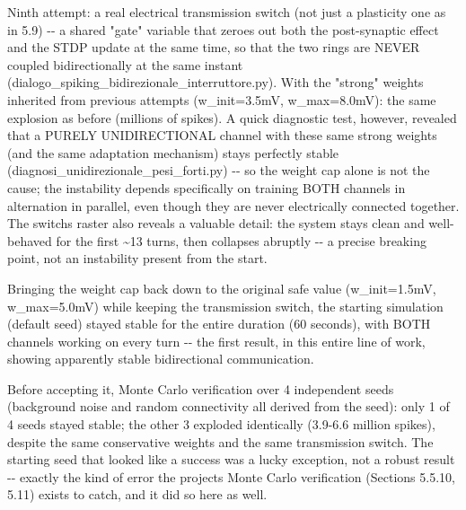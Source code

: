 \documentclass[
  english,
]{article}
\begin{document}
Ninth attempt: a real electrical transmission switch (not just a plasticity one as in 5.9) -\/- a shared "gate" variable that zeroes out both the post-synaptic effect and the STDP update at the same time, so that the two rings are NEVER coupled bidirectionally at the same instant (dialogo\_\allowbreak{}spiking\_\allowbreak{}bidirezionale\_\allowbreak{}interruttore.py). With the "strong" weights inherited from previous attempts (w\_\allowbreak{}init=3.5mV, w\_\allowbreak{}max=8.0mV): the same explosion as before (millions of spikes). A quick diagnostic test, however, revealed that a PURELY UNIDIRECTIONAL channel with these same strong weights (and the same adaptation mechanism) stays perfectly stable (diagnosi\_\allowbreak{}unidirezionale\_\allowbreak{}pesi\_\allowbreak{}forti.py) -\/- so the weight cap alone is not the cause; the instability depends specifically on training BOTH channels in alternation in parallel, even though they are never electrically connected together. The switch\textquotesingle s raster also reveals a valuable detail: the system stays clean and well-behaved for the first \textasciitilde13 turns, then collapses abruptly -\/- a precise breaking point, not an instability present from the start.

Bringing the weight cap back down to the original safe value (w\_\allowbreak{}init=1.5mV, w\_\allowbreak{}max=5.0mV) while keeping the transmission switch, the starting simulation (default seed) stayed stable for the entire duration (60 seconds), with BOTH channels working on every turn -\/- the first result, in this entire line of work, showing apparently stable bidirectional communication.

Before accepting it, Monte Carlo verification over 4 independent seeds (background noise and random connectivity all derived from the seed): only 1 of 4 seeds stayed stable; the other 3 exploded identically (3.9-6.6 million spikes), despite the same conservative weights and the same transmission switch. The starting seed that looked like a success was a lucky exception, not a robust result -\/- exactly the kind of error the project\textquotesingle s Monte Carlo verification (Sections 5.5.10, 5.11) exists to catch, and it did so here as well.
\end{document}
